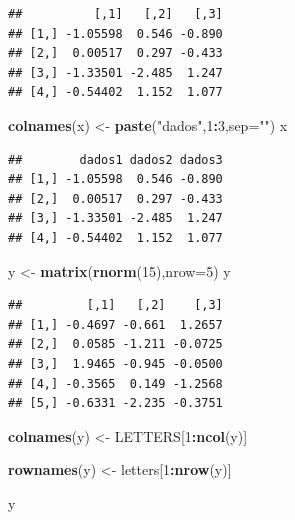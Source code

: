 \documentclass[
]{book}
\newenvironment{Shaded}{\begin{snugshade}}{\end{snugshade}}
\newcommand{\AttributeTok}[1]{\textcolor[rgb]{0.13,0.29,0.53}{#1}}
\newcommand{\DecValTok}[1]{\textcolor[rgb]{0.00,0.00,0.81}{#1}}
\newcommand{\FunctionTok}[1]{\textcolor[rgb]{0.13,0.29,0.53}{\textbf{#1}}}
\newcommand{\NormalTok}[1]{#1}
\newcommand{\OtherTok}[1]{\textcolor[rgb]{0.56,0.35,0.01}{#1}}
\newcommand{\SpecialCharTok}[1]{\textcolor[rgb]{0.81,0.36,0.00}{\textbf{#1}}}
\newcommand{\StringTok}[1]{\textcolor[rgb]{0.31,0.60,0.02}{#1}}
\begin{document}
\begin{verbatim}
##          [,1]   [,2]   [,3]
## [1,] -1.05598  0.546 -0.890
## [2,]  0.00517  0.297 -0.433
## [3,] -1.33501 -2.485  1.247
## [4,] -0.54402  1.152  1.077
\end{verbatim}

\begin{Shaded}
\begin{Highlighting}[]
\FunctionTok{colnames}\NormalTok{(x) }\OtherTok{\textless{}{-}} \FunctionTok{paste}\NormalTok{(}\StringTok{"dados"}\NormalTok{,}\DecValTok{1}\SpecialCharTok{:}\DecValTok{3}\NormalTok{,}\AttributeTok{sep=}\StringTok{""}\NormalTok{)}
\NormalTok{x}
\end{Highlighting}
\end{Shaded}

\begin{verbatim}
##        dados1 dados2 dados3
## [1,] -1.05598  0.546 -0.890
## [2,]  0.00517  0.297 -0.433
## [3,] -1.33501 -2.485  1.247
## [4,] -0.54402  1.152  1.077
\end{verbatim}

\begin{Shaded}
\begin{Highlighting}[]
\NormalTok{y }\OtherTok{\textless{}{-}} \FunctionTok{matrix}\NormalTok{(}\FunctionTok{rnorm}\NormalTok{(}\DecValTok{15}\NormalTok{),}\AttributeTok{nrow=}\DecValTok{5}\NormalTok{)}
\NormalTok{y }
\end{Highlighting}
\end{Shaded}

\begin{verbatim}
##         [,1]   [,2]    [,3]
## [1,] -0.4697 -0.661  1.2657
## [2,]  0.0585 -1.211 -0.0725
## [3,]  1.9465 -0.945 -0.0500
## [4,] -0.3565  0.149 -1.2568
## [5,] -0.6331 -2.235 -0.3751
\end{verbatim}

\begin{Shaded}
\begin{Highlighting}[]
\FunctionTok{colnames}\NormalTok{(y) }\OtherTok{\textless{}{-}}\NormalTok{ LETTERS[}\DecValTok{1}\SpecialCharTok{:}\FunctionTok{ncol}\NormalTok{(y)]}

\FunctionTok{rownames}\NormalTok{(y) }\OtherTok{\textless{}{-}}\NormalTok{ letters[}\DecValTok{1}\SpecialCharTok{:}\FunctionTok{nrow}\NormalTok{(y)]}

\NormalTok{y}
\end{Highlighting}
\end{Shaded}
\end{document}
